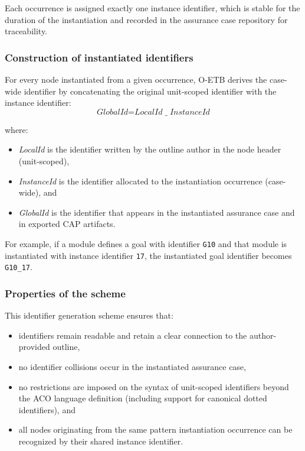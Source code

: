 \documentclass[12pt,twoside,a4paper]{article}
\begin{document}
Each occurrence is assigned exactly one instance identifier, which is stable for
the duration of the instantiation and recorded in the assurance case repository
for traceability.

\subsubsection{Construction of instantiated identifiers}
For every node instantiated from a given occurrence, O-ETB derives the
case-wide identifier by concatenating the original unit-scoped identifier
with the instance identifier:
\[
\textit{GlobalId} = \textit{LocalId} \; \texttt{\_} \; \textit{InstanceId}
\]

where:
\begin{itemize}
  \item \textit{LocalId} is the identifier written by the outline author in the
        node header (unit-scoped),
  \item \textit{InstanceId} is the identifier allocated to the instantiation
        occurrence (case-wide), and
  \item \textit{GlobalId} is the identifier that appears in the instantiated
        assurance case and in exported CAP artifacts.
\end{itemize}

For example, if a module defines a goal with identifier \texttt{G10} and that
module is instantiated with instance identifier \texttt{17}, the instantiated
goal identifier becomes \texttt{G10\_17}.

\subsubsection{Properties of the scheme}
This identifier generation scheme ensures that:
\begin{itemize}
  \item identifiers remain readable and retain a clear connection to the
        author-provided outline,
  \item no identifier collisions occur in the instantiated assurance case,
  \item no restrictions are imposed on the syntax of unit-scoped identifiers
        beyond the ACO language definition (including support for canonical
        dotted identifiers), and
  \item all nodes originating from the same pattern instantiation occurrence
        can be recognized by their shared instance identifier.
\end{itemize}
\end{document}
